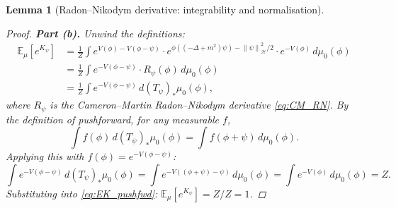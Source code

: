 \documentclass[11pt,a4paper]{article}
\newtheorem{lemma}[theorem]{Lemma}
\theoremstyle{definition}
\newcommand{\E}{\mathbb{E}}
\newcommand{\Hc}{\mathcal{H}}
\newcommand{\norm}[1]{\left\|#1\right\|}
\begin{document}
\begin{lemma}[Radon--Nikodym derivative: integrability and normalisation]
\begin{proof}
\medskip
\noindent\textbf{Part (b).}
Unwind the definitions:
\begin{align}
\E_\mu[e^{K_\psi}]
&= \frac{1}{Z}\!\int e^{V(\phi)-V(\phi-\psi)}\cdot e^{\phi((-\Delta+m^2)\psi)-\norm{\psi}_\Hc^2/2}\cdot e^{-V(\phi)}\,d\mu_0(\phi)\nonumber\\
&= \frac{1}{Z}\!\int e^{-V(\phi-\psi)}\cdot R_\psi(\phi)\,d\mu_0(\phi)\nonumber\\
&= \frac{1}{Z}\!\int e^{-V(\phi-\psi)}\,d(T_\psi)_*\mu_0(\phi),\label{eq:EK_pushfwd}
\end{align}
where $R_\psi$ is the Cameron--Martin Radon--Nikodym derivative \eqref{eq:CM_RN}.
By the definition of pushforward, for any measurable $f$,
\[
\int f(\phi)\,d(T_\psi)_*\mu_0(\phi) = \int f(\phi+\psi)\,d\mu_0(\phi).
\]
Applying this with $f(\phi) = e^{-V(\phi-\psi)}$:
\[
\int e^{-V(\phi-\psi)}\,d(T_\psi)_*\mu_0(\phi)
= \int e^{-V((\phi+\psi)-\psi)}\,d\mu_0(\phi)
= \int e^{-V(\phi)}\,d\mu_0(\phi)
= Z.
\]
Substituting into \eqref{eq:EK_pushfwd}: $\E_\mu[e^{K_\psi}] = Z/Z = 1$.
\end{proof}
\end{lemma}
\end{document}
